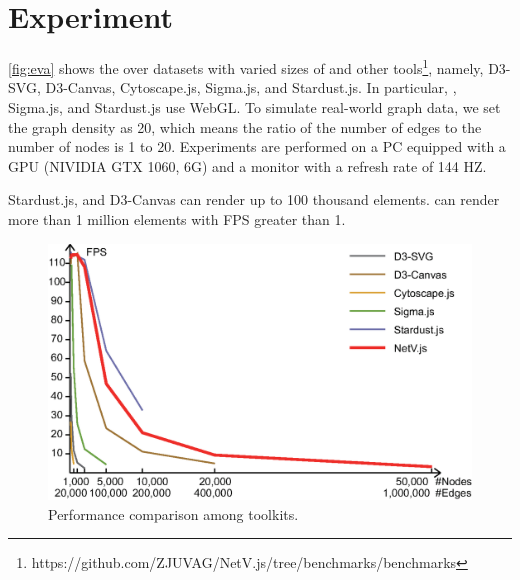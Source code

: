 \section{Experiment}\label{sec:experiment}
\autoref{fig:eva} shows the  over datasets with varied sizes of \name and other  tools\footnote{https://github.com/ZJUVAG/NetV.js/tree/benchmarks/benchmarks}, namely,  %
D3-SVG, D3-Canvas, Cytoscape.js, Sigma.js, and Stardust.js. In particular, \name, Sigma.js, and Stardust.js use WebGL. To simulate real-world graph data, we set the graph density as 20, which means the ratio of the number of edges to the number of nodes is 1 to 20. 
Experiments are performed on a PC equipped with a GPU (NIVIDIA GTX 1060, 6G) and a monitor with a refresh rate of 144 HZ.

Stardust.js, and D3-Canvas can render up to 100 thousand elements. \name can render more than 1 million elements with FPS greater than 1.

\begin{figure}[htbp]
    \includegraphics[width=\linewidth]{fig/eva.eps}
    \caption{
        Performance comparison among  toolkits.
    }
    \label{fig:eva}
\end{figure}
